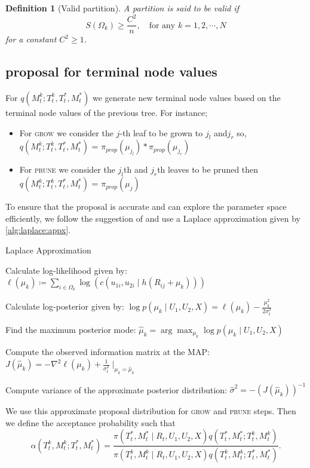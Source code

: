 \documentclass{amsart}
\newtheorem{definition}{Definition}[section]
\begin{document}
\begin{definition}[Valid partition]
	A partition is said to be valid if
	\begin{equation*}
		S(\Omega_k) \ge \frac{C^2}{n}, \quad\text{for any } k=1,2,\cdots, N
	\end{equation*}
	for a constant $C^2\ge 1$.
\end{definition}

\subsection{proposal for terminal node values}
For $q\left(M_t^k;T_t^k, T_t^\ast, M_t^\ast\right)$ we generate new terminal node values based on the terminal node values of the previous tree. For instance;

\begin{itemize}
	\item For \textsc{grow} we consider the $j$-th leaf to be grown to $j_l$ and$j_r$ so,
	$q\left(M_t^k;T_t^k, T_t^\ast, M_t^\ast\right)$ = $\pi_{prop}(\mu_{j_l})*\pi_{prop}(\mu_{j_r})$
	\item For \textsc{prune} we consider the $j_l$th and $j_r$th leaves to be pruned then $q\left(M_t^k;T_t^k, T_t^\ast, M_t^\ast\right)$ = $\pi_{prop}(\mu_j)$
\end{itemize}
To ensure that the proposal is accurate and can explore the parameter space efficiently, we follow the suggestion of \citet{Linero02012025} and use a Laplace approximation given by \cref{alg:laplace:appx}.

\begin{algorithm}[H]
	\caption{Laplace Approximation}\label{alg:laplace:appx}
	\begin{algorithmic}[1]
		\State Calculate log-likelihood given by: $\ell(\mu_k)\coloneqq\sum_{i\in \Omega_k}\log\left(c\left(u_{1i},u_{2i}\mid h\left(R_{ij}+\mu_k\right)\right)\right)$
		
		\State Calculate log-posterior given by: $\log p(\mu_k\mid U_1,U_2, X) = \ell(\mu_k) - \frac{\mu_k^2}{2\sigma_{t}^2}$
		
		\State Find the maximum posterior mode: $\hat{\mu}_k = \arg\max_{\mu_k}\log p(\mu_k\mid U_1,U_2, X)$
		
		\State Compute the observed information matrix at the MAP:
		$J(\hat{\mu}_k) = -\nabla^2\ell(\mu_k)+\frac{1}{\sigma_t^2}\mid_{\mu_k = \hat{\mu}_k}$
		
		\State Compute variance of the approximate posterior distribution: $\hat{\sigma}^2 = -(J(\hat{\mu}_k))^{-1}$
		
	\end{algorithmic}
\end{algorithm}
We use this approximate proposal distribution for \textsc{grow} and \textsc{prune} steps. Then we define the acceptance probability such that
\begin{equation}\label{eq:acc:prob}
	\alpha\left(T_t^k,M_t^k;T_t^\ast, M_t^\ast\right)
	= \frac{\pi(T_t^\ast,M_t^\ast \mid R_t, U_1, U_2, X)q\left(T_t^\ast, M_t^\ast;T_t^k,M_t^k\right)}
	{\pi(T_t^k,M_t^k \mid R_t, U_1, U_2, X)q\left(T_t^k,M_t^k;T_t^\ast, M_t^\ast\right)}.
\end{equation}
\end{document}
